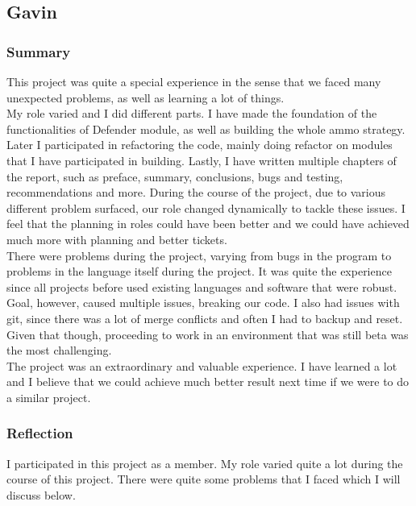 \newpage
\subsection{Gavin}
\subsubsection{Summary}
This project was quite a special experience in the sense that we faced many unexpected problems, as well as learning a lot of things.\\

My role varied and I did different parts. I have made the foundation of the functionalities of Defender module, as well as building the whole ammo strategy. Later I participated in refactoring the code, mainly doing refactor on modules that I have participated in building. Lastly, I have written multiple chapters of the report, such as preface, summary, conclusions, bugs and testing, recommendations and more. 
During the course of the project, due to various different problem surfaced, our role changed dynamically to tackle these issues. I feel that the planning in roles could have been better and we could have achieved much more with planning and better tickets.\\

There were problems during the project, varying from bugs in the program to problems in the language itself during the project. It was quite the experience since all projects before used existing languages and software that were robust. Goal, however, caused multiple issues, breaking our code. I also had issues with git, since there was a lot of merge conflicts and often I had to backup and reset. Given that though, proceeding to work in an environment that was still beta was the most challenging.\\

The project was an extraordinary and valuable experience. I have learned a lot and I believe that we could achieve much better result next time if we were to do a similar project.
\subsubsection{Reflection}
I participated in this project as a member. My role varied quite a lot during the course of this project. There were quite some problems that I faced which I will discuss below.

\noindent
